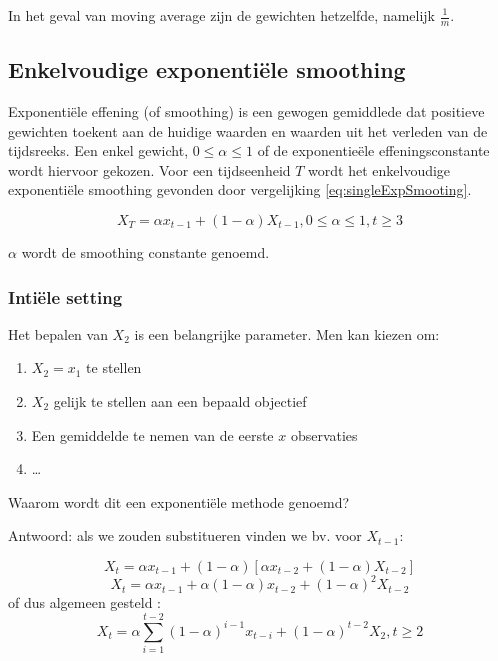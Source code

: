 In het geval van moving average zijn de gewichten hetzelfde, namelijk $\frac{1}{m}$.

\subsection{Enkelvoudige exponenti\"ele smoothing}
Exponenti\"ele effening (of smoothing) is een gewogen gemiddlede dat positieve gewichten toekent aan de huidige waarden en waarden uit het verleden van de tijdsreeks. Een enkel gewicht, $0\leq \alpha \leq1$ of de exponentie\"ele effeningsconstante wordt hiervoor gekozen. 
Voor een tijdseenheid $T$ wordt het enkelvoudige exponenti\"ele smoothing gevonden door vergelijking \ref{eq:singleExpSmooting}.

\begin{definition}
\begin{equation}
	X_{T} = \alpha x_{t-1} + (1-\alpha)X_{t-1}, 0 \leq \alpha \leq 1, t \geq 3
\label{eq:singleExpSmooting}
\end{equation}
\end{definition}

$\alpha$ wordt de smoothing constante genoemd.

\subsubsection{Inti\"ele setting}
Het bepalen van $X_{2}$ is een belangrijke parameter. Men kan kiezen om:
\begin{enumerate}
	\item $X_{2} = x_{1}$ te stellen
	\item $X_{2}$ gelijk te stellen aan een bepaald objectief
	\item Een gemiddelde te nemen van de eerste $x$ observaties
	\item \dots
\end{enumerate}

\begin{exercise}
	Waarom wordt dit een exponenti\"ele methode genoemd?
\end{exercise}
Antwoord: als we zouden substitueren vinden we bv. voor $X_{t-1}$:

\[ X_{t} = \alpha x_{t-1} + (1-\alpha)\left[\alpha x_{t-2} + (1-\alpha)X_{t-2}\right] \] 
\[ X_{t} = \alpha x_{t-1} + \alpha (1-\alpha)x_{t-2} + (1-\alpha)^{2} X_{t-2} \]
of dus algemeen gesteld :
\[ X_{t} = \alpha \sum_{i=1}^{t-2}(1-\alpha)^{i-1}x_{t-i} + (1-\alpha)^{t-2} X_{2}, t \geq 2 \]

